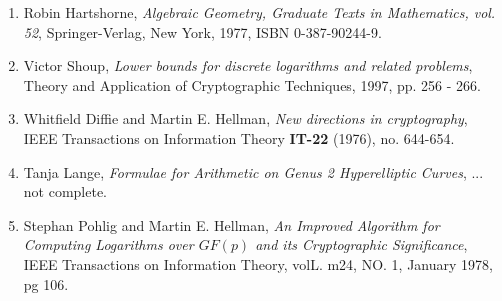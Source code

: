 

\begin{enumerate}[1]
	\item \label{Hartshorne} Robin Hartshorne, \textit{Algebraic Geometry, Graduate Texts in Mathematics, vol. 52}, Springer-Verlag, New York, 1977, ISBN 0-387-90244-9.   
	
	\item \label{VictorShoup} Victor Shoup, \textit{Lower bounds for discrete logarithms and related problems}, Theory and Application of Cryptographic Techniques, 1997, pp. 256 - 266. 
	
	\item \label{WhitfieldDiffieMartinHellman} Whitfield Diffie and Martin E. Hellman, \textit{New directions in cryptography}, IEEE Transactions on Information Theory \textbf{IT-22} (1976), no. 644-654.  

	\item \label{TanjaLange} Tanja Lange, \textit{Formulae for Arithmetic on Genus 2 Hyperelliptic Curves}, ... not complete.

	\item \label{PohligHellman} Stephan Pohlig and Martin E. Hellman, \textit{An Improved Algorithm for Computing Logarithms over $GF(p)$ and its Cryptographic Significance}, IEEE Transactions on Information Theory, volL. m24, NO. 1, January 1978, pg 106.  
\end{enumerate}